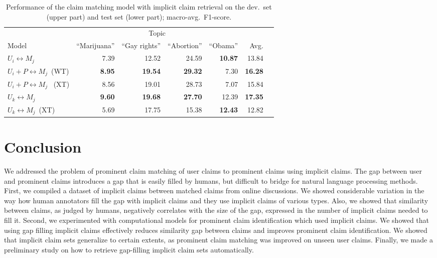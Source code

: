 \begin{table}
\begin{center}
{\small
\setlength{\tabcolsep}{4.8pt}
\begin{tabular}{lrrrrrr}
\toprule
&\multicolumn{4}{c}{Topic}\\
\cmidrule(lr){2-5}
Model & ``Marijuana'' & ``Gay rights''  & ``Abortion'' & ``Obama'' & Avg. \\
\midrule
$U_i \leftrightarrow M_j$ & 7.39          & 12.52        & 24.59       & {\bf 10.87} & 13.84 \\
$U_i + P \leftrightarrow M_j$\ (WT)     & {\bf 8.95}    & {\bf 19.54}  & {\bf 29.32} & 7.30        & {\bf 16.28} \\
$U_i + P \leftrightarrow M_j$ \ (XT)   & 8.56          & 19.01        & 28.73       & 7.07        & 15.84 \\
\midrule
$U_k \leftrightarrow M_j$            & {\bf 9.60}   & {\bf 19.68}   & {\bf 27.70} & 12.39       & {\bf 17.35} \\
$U_k \leftrightarrow M_j$\ (XT)  & 5.69         &  17.75        & 15.38       & {\bf 12.43} & 12.82 \\
\bottomrule
\end{tabular}}
\caption{Performance of the claim matching model with implicit claim retrieval on the
dev.~set (upper part) and test set (lower part); macro-avg.~F1-score.}
\label{tab:argpremise_retrieval}
\end{center}
\end{table}

\section{Conclusion}
\label{sec:argpremise_conclusion}

We addressed the problem of prominent claim matching of user claims to prominent claims
using implicit claims.
The gap between user and prominent claims introduces a gap that is 
easily filled by humans, but difficult to bridge for natural language processing 
methods. 
First, we compiled a dataset of implicit claims between matched claims from 
online discussions.
We showed considerable variation in the way how human annotators fill the gap
with implicit claims and they use implicit claims of various types. 
Also, we showed that similarity between claims, as judged by humans, negatively
correlates with the size of the gap, 
expressed in the number of implicit claims needed to fill it. 
Second, we experimented with computational models for prominent claim identification 
which used implicit claims. 
We showed that using gap filling implicit claims effectively reduces similarity gap between claims 
and improves prominent claim identification. 
We showed that implicit claim sets generalize to certain extents, as prominent claim matching was
improved on unseen user claims. 
Finally, we made a preliminary study on how to retrieve gap-filling implicit
claim sets automatically.

